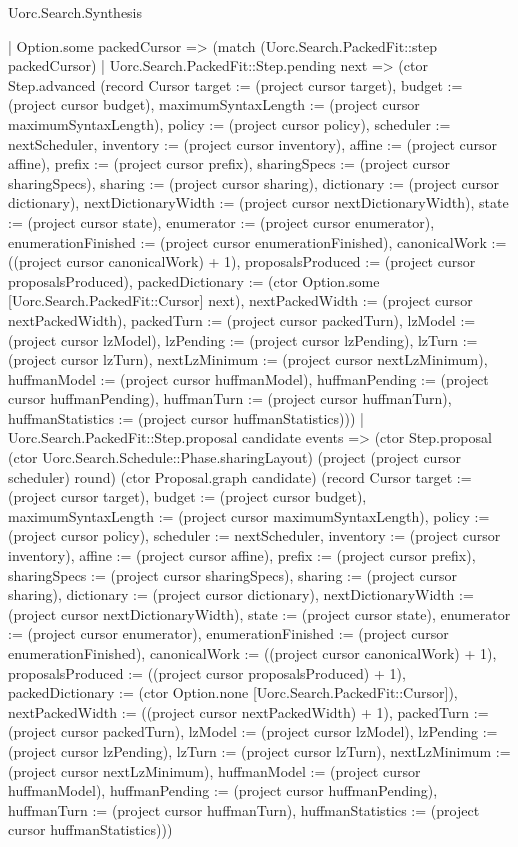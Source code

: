\begin{lexlean}{Uorc.Search.Synthesis}
\begin{semanticmodule}
{    | Option.some packedCursor => (match (Uorc.Search.PackedFit::step packedCursor)
      | Uorc.Search.PackedFit::Step.pending next => (ctor Step.advanced (record Cursor {target := (project cursor target), budget := (project cursor budget), maximumSyntaxLength := (project cursor maximumSyntaxLength), policy := (project cursor policy), scheduler := nextScheduler, inventory := (project cursor inventory), affine := (project cursor affine), prefix := (project cursor prefix), sharingSpecs := (project cursor sharingSpecs), sharing := (project cursor sharing), dictionary := (project cursor dictionary), nextDictionaryWidth := (project cursor nextDictionaryWidth), state := (project cursor state), enumerator := (project cursor enumerator), enumerationFinished := (project cursor enumerationFinished), canonicalWork := ((project cursor canonicalWork) + 1), proposalsProduced := (project cursor proposalsProduced), packedDictionary := (ctor Option.some [Uorc.Search.PackedFit::Cursor] next), nextPackedWidth := (project cursor nextPackedWidth), packedTurn := (project cursor packedTurn), lzModel := (project cursor lzModel), lzPending := (project cursor lzPending), lzTurn := (project cursor lzTurn), nextLzMinimum := (project cursor nextLzMinimum), huffmanModel := (project cursor huffmanModel), huffmanPending := (project cursor huffmanPending), huffmanTurn := (project cursor huffmanTurn), huffmanStatistics := (project cursor huffmanStatistics)}))
      | Uorc.Search.PackedFit::Step.proposal candidate events => (ctor Step.proposal (ctor Uorc.Search.Schedule::Phase.sharingLayout) (project (project cursor scheduler) round) (ctor Proposal.graph candidate) (record Cursor {target := (project cursor target), budget := (project cursor budget), maximumSyntaxLength := (project cursor maximumSyntaxLength), policy := (project cursor policy), scheduler := nextScheduler, inventory := (project cursor inventory), affine := (project cursor affine), prefix := (project cursor prefix), sharingSpecs := (project cursor sharingSpecs), sharing := (project cursor sharing), dictionary := (project cursor dictionary), nextDictionaryWidth := (project cursor nextDictionaryWidth), state := (project cursor state), enumerator := (project cursor enumerator), enumerationFinished := (project cursor enumerationFinished), canonicalWork := ((project cursor canonicalWork) + 1), proposalsProduced := ((project cursor proposalsProduced) + 1), packedDictionary := (ctor Option.none [Uorc.Search.PackedFit::Cursor]), nextPackedWidth := ((project cursor nextPackedWidth) + 1), packedTurn := (project cursor packedTurn), lzModel := (project cursor lzModel), lzPending := (project cursor lzPending), lzTurn := (project cursor lzTurn), nextLzMinimum := (project cursor nextLzMinimum), huffmanModel := (project cursor huffmanModel), huffmanPending := (project cursor huffmanPending), huffmanTurn := (project cursor huffmanTurn), huffmanStatistics := (project cursor huffmanStatistics)}))
}
\end{semanticmodule}
\end{lexlean}
